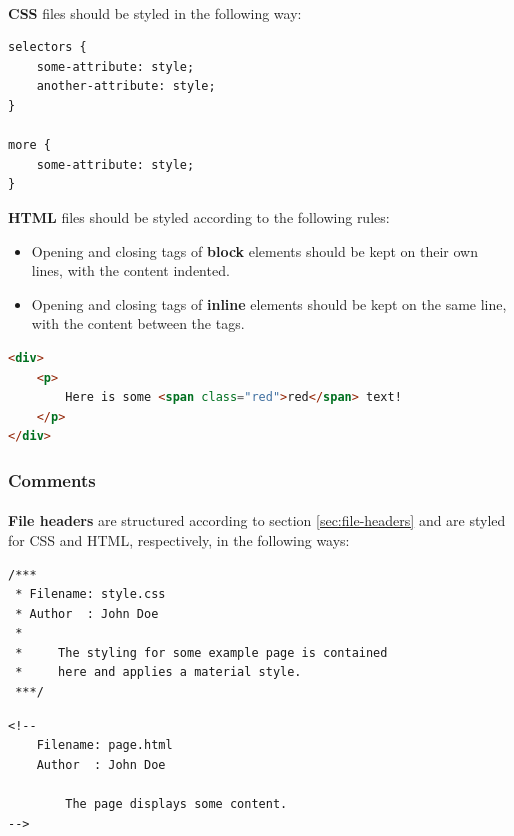 \documentclass{article}
\begin{document}
    \paragraph{}
    \textbf{CSS} files should be styled in the following way:

    \begin{lstlisting}
selectors {
    some-attribute: style;
    another-attribute: style;
}

more {
    some-attribute: style;
}
    \end{lstlisting}

    \textbf{HTML} files should be styled according to the following rules:

    \begin{itemize}
        \item Opening and closing tags of \textbf{block} elements should be kept
            on their own lines, with the content indented.
        \item Opening and closing tags of \textbf{inline} elements should be
            kept on the same line, with the content between the tags.
    \end{itemize}

    \begin{lstlisting}[language=html]
<div>
    <p>
        Here is some <span class="red">red</span> text!
    </p>
</div>
    \end{lstlisting}

    \subsubsection{Comments}
    \label{sec:ls-html-com}

    \paragraph{}
    \textbf{File headers} are structured according to section
    \ref{sec:file-headers} and are styled for CSS and HTML, respectively, in the
    following ways:

    \begin{lstlisting}
/***
 * Filename: style.css
 * Author  : John Doe
 *
 *     The styling for some example page is contained
 *     here and applies a material style.
 ***/
    \end{lstlisting}

    \begin{lstlisting}
<!--
    Filename: page.html
    Author  : John Doe
    
        The page displays some content.
-->
    \end{lstlisting}
\end{document}
